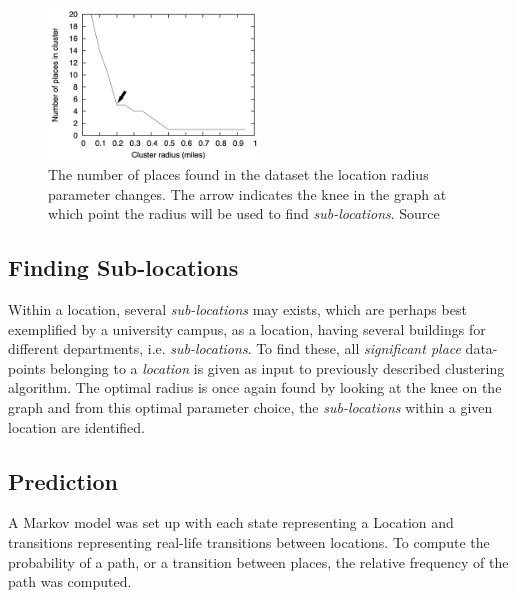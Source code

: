 \begin{figure}
    \centering
    \includegraphics[width=0.5\textwidth]{images/knee_graph.png}
    \caption{The number of places found in the dataset the location radius parameter changes. The arrow indicates the knee in the graph at which point the radius will be used to find \textit{sub-locations}. Source \cite{learning_significant_locations}}
    \label{fig:my_label}
\end{figure}

\subsection{Finding Sub-locations}
Within a location, several \textit{sub-locations} may exists, which are perhaps best exemplified by a university campus, as a location, having several buildings for different departments, i.e. \textit{sub-locations}. To find these, all \textit{significant place} data-points belonging to a \textit{location} is given as input to previously described clustering algorithm. The optimal radius is once again found by looking at the knee on the graph and from this optimal parameter choice, the \textit{sub-locations} within a given location are identified.

\subsection{Prediction}
A Markov model was set up with each state representing a Location and transitions representing real-life transitions between locations. To compute the probability of a path, or a transition between places, the relative frequency of the path was computed.

